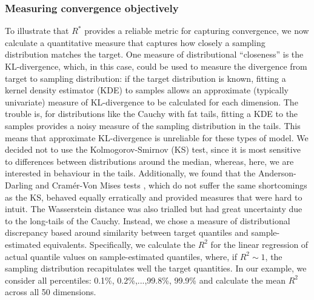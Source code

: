 \documentclass{article}
\begin{document}
\subsubsection{Measuring convergence objectively}\label{sec:cauchy_objective}
To illustrate that $R^*$ provides a reliable metric for capturing convergence, we now calculate a quantitative measure that captures how closely a sampling distribution matches the target. One measure of distributional ``closeness'' is the KL-divergence, which, in this case, could be used to measure the divergence from target to sampling distribution: if the target distribution is known, fitting a kernel density estimator (KDE) to samples allows an approximate (typically univariate) measure of KL-divergence to be calculated for each dimension. The trouble is, for distributions like the Cauchy with fat tails, fitting a KDE to the samples provides a noisy measure of the sampling distribution in the tails. This means that approximate KL-divergence is unreliable for these types of model. We decided not to use the Kolmogorov-Smirnov (KS) test, since it is most sensitive to differences between distributions around the median, whereas, here, we are interested in behaviour in the tails. Additionally, we found that the Anderson-Darling and Cram\'er-Von Mises tests \citep{faraway2019goftest}, which do not suffer the same shortcomings as the KS, behaved equally erratically and provided measures that were hard to intuit. The Wasserstein distance was also trialled but had great uncertainty due to the long-tails of the Cauchy. Instead, we chose a measure of distributional discrepancy based around similarity between target quantiles and sample-estimated equivalents. Specifically, we calculate the $R^2$ for the linear regression of actual quantile values on sample-estimated quantiles, where, if $R^2\sim 1$, the sampling distribution recapitulates well the target quantities. In our example, we consider all percentiles: 0.1\%, 0.2\%,...,99.8\%, 99.9\% and calculate the mean $R^2$ across all 50 dimensions.
\end{document}
